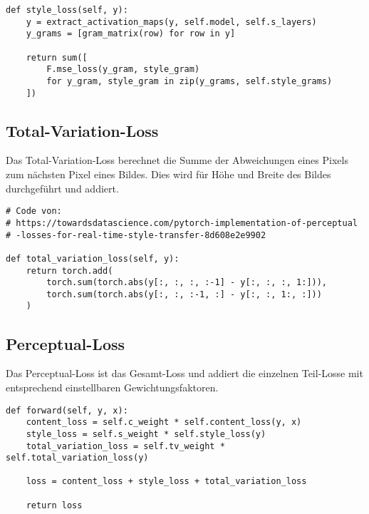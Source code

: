 \begin{listing}[H]
\begin{verbatim}
def style_loss(self, y):
    y = extract_activation_maps(y, self.model, self.s_layers)
    y_grams = [gram_matrix(row) for row in y]

    return sum([
        F.mse_loss(y_gram, style_gram)
        for y_gram, style_gram in zip(y_grams, self.style_grams)
    ])
\end{verbatim}
\end{listing}

\subsection{Total-Variation-Loss}

Das Total-Variation-Loss berechnet die Summe der Abweichungen eines Pixels zum nächsten Pixel eines Bildes. Dies wird für Höhe und Breite des Bildes durchgeführt und addiert.

\begin{listing}[H]
\begin{verbatim}
# Code von: 
# https://towardsdatascience.com/pytorch-implementation-of-perceptual
# -losses-for-real-time-style-transfer-8d608e2e9902

def total_variation_loss(self, y):
    return torch.add(
        torch.sum(torch.abs(y[:, :, :, :-1] - y[:, :, :, 1:])),
        torch.sum(torch.abs(y[:, :, :-1, :] - y[:, :, 1:, :]))
    )
\end{verbatim}
\end{listing}

\subsection{Perceptual-Loss}

Das Perceptual-Loss ist das Gesamt-Loss und addiert die einzelnen Teil-Losse mit entsprechend einstellbaren Gewichtungsfaktoren.

\begin{listing}[H]
\begin{verbatim}
def forward(self, y, x):
    content_loss = self.c_weight * self.content_loss(y, x)
    style_loss = self.s_weight * self.style_loss(y)
    total_variation_loss = self.tv_weight * self.total_variation_loss(y)

    loss = content_loss + style_loss + total_variation_loss

    return loss
\end{verbatim}
\end{listing}

